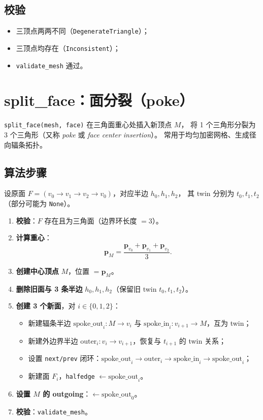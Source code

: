 \documentclass[11pt,a4paper]{article}
\begin{document}
\subsection{校验}

\begin{itemize}
  \item 三顶点两两不同（\texttt{DegenerateTriangle}）；
  \item 三顶点均存在（\texttt{Inconsistent}）；
  \item \texttt{validate\_mesh} 通过。
\end{itemize}

\section{split\_face：面分裂（poke）}

\texttt{split\_face(mesh, face)} 在三角面重心处插入新顶点 $M$，
将 1 个三角形分裂为 3 个三角形（又称 \emph{poke} 或 \emph{face center insertion}）。
常用于均匀加密网格、生成径向辐条拓扑。

\subsection{算法步骤}

设原面 $F = (v_0 \to v_1 \to v_2 \to v_0)$，对应半边 $h_0, h_1, h_2$，
其 twin 分别为 $t_0, t_1, t_2$（部分可能为 \texttt{None}）。

\begin{enumerate}
  \item \textbf{校验}：$F$ 存在且为三角面（边界环长度 $=3$）。
  \item \textbf{计算重心}：
        \[
          \mathbf{p}_M = \frac{\mathbf{p}_{v_0} + \mathbf{p}_{v_1} + \mathbf{p}_{v_2}}{3}.
        \]
  \item \textbf{创建中心顶点} $M$，位置 $= \mathbf{p}_M$。
  \item \textbf{删除旧面与 3 条半边} $h_0, h_1, h_2$（保留旧 twin $t_0, t_1, t_2$）。
  \item \textbf{创建 3 个新面}，对 $i \in \{0, 1, 2\}$：
        \begin{itemize}
          \item 新建辐条半边 $\text{spoke\_out}_i: M \to v_{i}$ 与 $\text{spoke\_in}_i: v_{i+1} \to M$，互为 twin；
          \item 新建外边界半边 $\text{outer}_i: v_i \to v_{i+1}$，恢复与 $t_{i+1}$ 的 twin 关系；
          \item 设置 \texttt{next/prev} 闭环：$\text{spoke\_out}_i \to \text{outer}_i \to \text{spoke\_in}_i \to \text{spoke\_out}_i$；
          \item 新建面 $F_i$，\texttt{halfedge} $\leftarrow \text{spoke\_out}_i$。
        \end{itemize}
  \item \textbf{设置 $M$ 的 outgoing}：$\leftarrow \text{spoke\_out}_0$。
  \item \textbf{校验}：\texttt{validate\_mesh}。
\end{enumerate}
\end{document}
